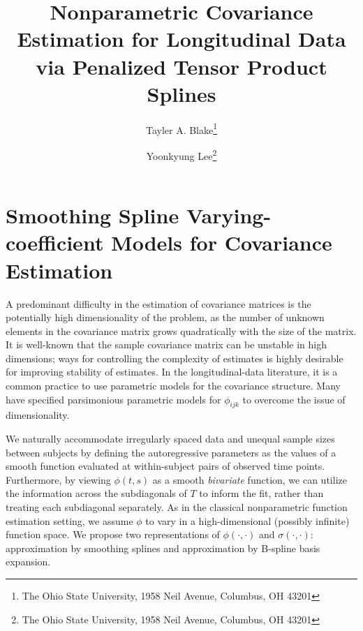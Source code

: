 \documentclass[12pt]{article}
\theoremstyle{definition}
\def\bL{\mathbf{L}}
\begin{document}
\def\bL{\mathbf{L}}



\title{ Nonparametric Covariance Estimation for Longitudinal Data via Penalized Tensor Product Splines}

\author{Tayler A. Blake\thanks{The Ohio State University, 1958 Neil Avenue, Columbus, OH 43201} \and  Yoonkyung Lee\thanks{The Ohio State University, 1958 Neil Avenue, Columbus, OH 43201}}


\maketitle

\section{Smoothing Spline Varying-coefficient Models for Covariance Estimation}

A predominant difficulty in the estimation of covariance matrices is the potentially high dimensionality of the problem, as the number of unknown elements in the covariance matrix grows quadratically with the size of the matrix. It is well-known that the sample covariance matrix can be unstable in high dimensions; ways for controlling the complexity of estimates is highly desirable for improving stability of estimates. In the longitudinal-data literature, it is a common practice to use parametric models for the covariance structure.  Many have specified parsimonious parametric models for $\phi_{ijk}$ to overcome the issue of dimensionality.  

\bigskip

We naturally accommodate irregularly spaced data and unequal sample sizes between subjects by defining the autoregressive parameters as the values of a smooth function evaluated at within-subject pairs of observed time points.  Furthermore, by viewing $\phi\left(t,s\right)$ as a smooth \emph{bivariate} function, we can utilize the information across the subdiagonals of $T$ to inform the fit, rather than treating each subdiagonal separately.  As in the classical nonparametric function estimation setting, we assume $\phi$ to vary in a high-dimensional (possibly infinite) function space. We propose two representations of $\phi\left(\cdot, \cdot\right)$ and $\sigma\left(\cdot, \cdot\right)$: approximation by smoothing splines and approximation by B-spline basis expansion. 
\end{document}
